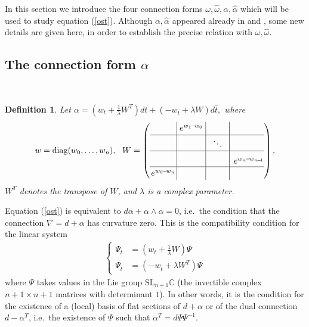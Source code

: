 \documentclass[a4paper,12pt,leqno]{amsart}
\numberwithin{equation}{section}
\theoremstyle{plain}
\newtheorem{definition}[theorem]{Definition}
\theoremstyle{definition}
\newcommand{\C}{\mathbb C}
\newcommand{\al}{\alpha}
\newcommand{\la}{\lambda}
\newcommand{\om}{\omega}
\DeclareMathOperator{\diag}{diag}
\newcommand{\SL}{\textrm{SL}}
\newcommand{\na}{\nabla}
\newcommand{\tbar}{  {\bar t}  }
\begin{document}
In this section we introduce the four connection forms
$\om,\hat\om,\al,\hat\al$ which will be used to study equation (\ref{ost}).
Although $\al,\hat\al$ appeared already in \cite{GuItLiXX} and \cite{GuItLi15}, some
new details are given here, in order to establish the precise relation with $\om,\hat\om$.

\subsection{The connection form $\al$}\label{four1}  \ 

\begin{definition}\label{alpha}
Let
$
 \al = (w_t+\tfrac1\la W^T)dt + (-w_{\tbar}+\la W)d\tbar,
$
where
 \[
 w=\diag(w_0,\dots,w_n),\ \ 
 W=
 \left(
\begin{array}{c|c|c|c}
\vphantom{(w_0)_{(w_0)}^{(w_0)}}
 & \!e^{w_1\!-\!w_0}\! & &  
 \\
\hline
  &  & \  \ddots\   & \\
\hline
\vphantom{\ddots}
  & &  &  e^{w_n\!-\!w_{n\!-\!1}}\!\!\!
\\
\hline
\vphantom{(w_0)_{(w_0)}^{(w_0)}}
\!\! e^{w_0\!-\!w_n} \!\!  & &  &  \!
\end{array}
\right),
\]
$W^T$ denotes the transpose of $W$, and $\la$ is a complex parameter.
\end{definition}

Equation (\ref{ost}) is equivalent to $d\al+\al\wedge\al=0$, i.e.\ the condition that the connection $\na=d+\al$ has curvature zero.  This is the compatibility condition for the linear system
\begin{align}
\begin{cases}
\Psi_t&=(w_t+\tfrac1\la W)\Psi\\
\Psi_\tbar&=(-w_{\tbar}+\la W^T)\Psi
\end{cases}
\end{align}
where $\Psi$ takes values in the Lie group $\SL_{n+1}\C$ (the invertible complex 
$n\!+\!1\times n\!+\!1$ matrices with determinant $1$).  In other words, it is the condition for the existence of a (local) basis of flat sections of $d+\al$ or of the dual connection $d-\al^T$, i.e.\ the existence of $\Psi$ such that $\al^T=d\Psi\Psi^{-1}$. 
\end{document}
